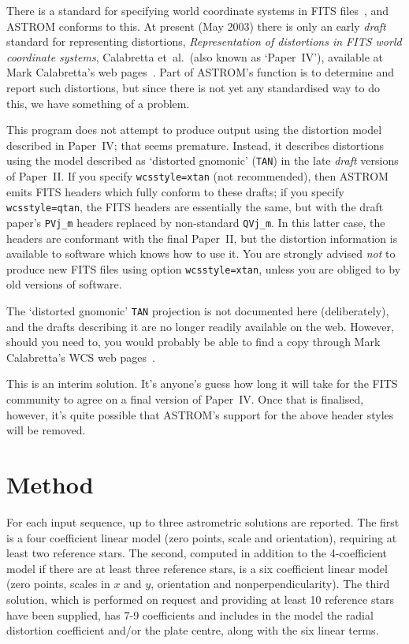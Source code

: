 \documentclass[twoside,11pt]{article}
\newcommand{\xlabel}[1]{}
\renewcommand{\_}{\texttt{\symbol{95}}}
\begin{document}
There is a standard for specifying world coordinate systems in FITS
files~\cite{fitswcs2}, and ASTROM conforms to this.  At present (May
2003) there is only an early \emph{draft} standard for representing
distortions, \emph{Representation of distortions in FITS world
coordinate systems}, Calabretta et~al.\ (also known as `Paper~IV'),
available at Mark Calabretta's web pages~\cite{fitswcsurl}.  Part of
ASTROM's function is to determine and report such distortions, but
since there is not yet any standardised way to do this, we have
something of a problem.

This program does not attempt to produce output using the distortion
model described in Paper~IV; that seems premature.  Instead, it
describes distortions using the model described as `distorted
gnomonic' (\texttt{TAN}) in the late \emph{draft} versions of
Paper~II.  If you specify \texttt{wcsstyle=xtan} (not recommended),
then ASTROM emits FITS headers which fully conform to these drafts; if
you specify \texttt{wcsstyle=qtan}, the FITS headers are essentially
the same, but with the draft paper's \verb|PVj_m| headers
replaced by non-standard \verb|QVj_m|.  In this latter
case, the headers are conformant with the final Paper~II, but the
distortion information is available to software which knows how to use
it.  You are strongly advised \emph{not} to produce new FITS files
using option
\texttt{wcsstyle=xtan}, unless you are obliged to by old versions of
software.

The `distorted gnomonic' \texttt{TAN} projection is not documented
here (deliberately), and the drafts describing it are no longer
readily available on the web.  However, should you need to, you would
probably be able to find a copy through Mark Calabretta's WCS web
pages~\cite{fitswcsurl}.

This is an interim solution.  It's anyone's guess how long it will
take for the FITS community to agree on a final version of Paper~IV.
Once that is finalised, however, it's quite possible that ASTROM's
support for the above header styles will be removed.

\section{\xlabel{method}Method}
\label{method}

For each input sequence, up to three astrometric solutions are
reported. The first is a four coefficient linear model (zero points,
scale and orientation), requiring at least two reference stars.
The second, computed in addition to the 4-coefficient model if there
are at least three reference stars, is a six coefficient linear model
(zero points, scales in $x$ and $y$, orientation and nonperpendicularity).
The third solution, which is performed on request and providing at least
10 reference stars have been supplied, has 7-9 coefficients and includes
in the model the radial distortion coefficient and/or the plate centre,
along with the six linear terms.
\end{document}
